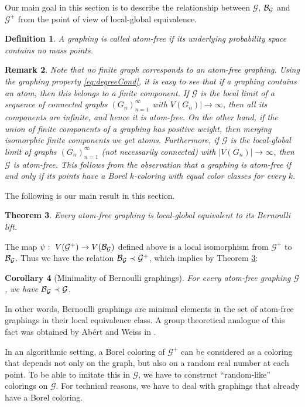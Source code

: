 \documentclass{article}
\newtheorem{theorem}{Theorem}[section]
\newtheorem{corollary}[theorem]{Corollary}
\newtheorem{remark}[theorem]{Remark}
\newtheorem{definition}[theorem]{Definition}
\def\GG{\mathcal{G}}\def\HH{\mathcal{H}}\def\II{\mathcal{I}}
\begin{document}
Our main goal in this section is to describe the relationship between
$\GG$, $\BB_\GG$ and $\GG^+$ from the point of view of local-global
equivalence.

\begin{definition}
A graphing is called \emph{atom-free} if its underlying probability space
contains no mass points.
\end{definition}

\begin{remark}
\label{rem:continuity} Note that no finite graph corresponds to an
atom-free graphing. Using the graphing property
\eqref{eq:degreeCond}, it is easy to see that if a graphing contains
an atom, then this belongs to a finite component. If $\GG$ is the
local limit of a sequence of connected graphs $(G_n)_{n=1}^\infty$
with $V(G_n)| \to \infty$, then all its components are infinite, and
hence it is atom-free. On the other hand, if the union of finite
components of a graphing has positive weight, then merging isomorphic
finite components we get atoms. Furthermore, if $\GG$ is the
local-global limit of graphs $(G_n)_{n=1}^\infty$ (not necessarily
connected) with $|V(G_n)| \to \infty$, then $\GG$ is atom-free. This
follows from the observation that a graphing is atom-free if and only
if its points have a Borel $k$-coloring with equal color classes for
every $k$.
\end{remark}

The following is our main result in this section.
\begin{theorem}\label{THM:BERLIFT}
Every atom-free graphing is local-global equivalent to its Bernoulli lift.
\end{theorem}

The map $\psi:~V(\GG^+)\to V(\BB_\GG)$ defined above is a local
isomorphism from $\GG^+$ to $\BB_\GG$. Thus we have the relation
$\BB_\GG\prec\GG^+$, which implies by Theorem \ref{THM:BERLIFT}:

\begin{corollary}[Minimality of Bernoulli graphings]\label{cor:bermin}
For every atom-free graphing $\GG$, we have $\BB_\GG\prec\GG$.
\end{corollary}

{In other words, Bernoulli graphings are minimal elements in the set
of atom-free graphings in their local equivalence class. A group
theoretical analogue of this fact was obtained by Ab\'ert and Weiss
in \cite{AW}.}

In an algorithmic setting, a Borel coloring of $\GG^+$ can be
considered as a coloring that depends not only on the graph, but also
on a random real number at each point. To be able to imitate this in
$\GG$, we have to construct ``random-like'' colorings on $\GG$. For
technical reasons, we have to deal with graphings that already have a
Borel coloring.
\end{document}
